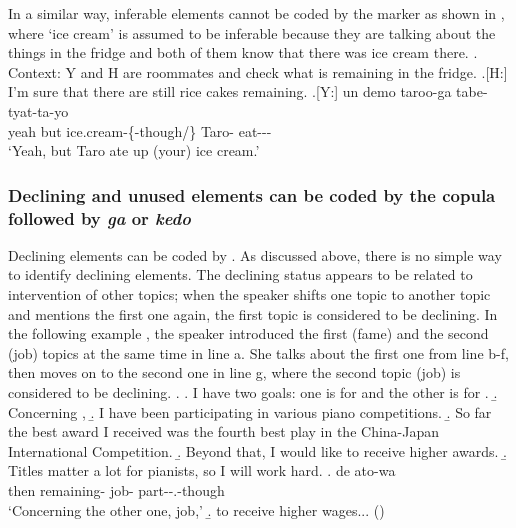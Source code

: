 In a similar way,
inferable elements cannot be coded by the marker
as shown in \Next,
where `ice cream' is assumed to be inferable because they are talking about the things in the fridge and both of them know that there was ice cream there.
%
\ex. Context:
	Y and H are roommates and check what is remaining in the fridge.
	\a.[H:] I'm sure that there are still rice cakes remaining.
	\bg.[Y:] un demo  taroo-ga tabe-tyat-ta-yo \\
		yeah but ice.cream-\{-though/\} Taro- eat--- \\
		`Yeah, but Taro ate up (your) ice cream.'


\subsubsection{Declining and unused elements can be coded by the copula followed by \textit{ga} or \textit{kedo}}

Declining elements can be coded by .
As discussed above,
there is no simple way to identify declining elements.
The declining status appears to be related to intervention of other topics;
when the speaker shifts one topic to another topic and mentions the first one again,
the first topic is considered to be declining.
In the following example \Next,
the speaker introduced the first (fame) and the second (job) topics at the same time in line a.
She talks about the first one from line b-f,
then moves on to the second one in line g,
where the second topic (job) is considered to be declining.
%
\ex.\label{sigoto2}
 \a. I have two goals: one is for  and the other is for .
 \b. Concerning ,
 \b. I have been participating in various piano competitions.
 \b. So far the best award I received was the fourth best play in the China-Japan International Competition.
 \b. Beyond that, I would like to receive higher awards.
 \b. Titles matter a lot for pianists, so I will work hard.
 \bg. de ato-wa   \\
 	then remaining- job- part--.-though \\
	`Concerning the other one, job,'
 \b. to receive higher wages...
\hfill{()}
%


